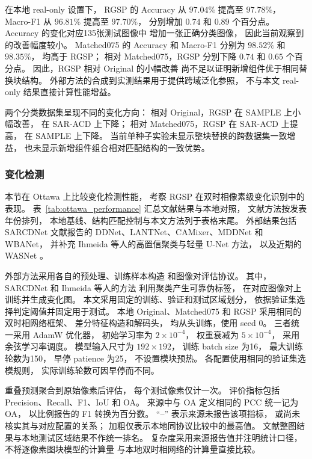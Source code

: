 在本地 real-only 设置下，
RGSP 的 Accuracy 从 $97.04\%$ 提高至 $97.78\%$，
Macro-F1 从 $96.81\%$ 提高至 $97.70\%$，
分别增加 $0.74$ 和 $0.89$ 个百分点。
Accuracy 的变化对应135张测试图像中
增加一张正确分类图像，
因此当前观察到的改善幅度较小。
Matched075 的 Accuracy 和 Macro-F1
分别为 $98.52\%$ 和 $98.35\%$，
均高于 RGSP；
相对 Matched075，RGSP 分别下降
$0.74$ 和 $0.65$ 个百分点。
因此，RGSP 相对 Original 的小幅改善
尚不足以证明新增组件优于相同替换块结构。
外部方法的合成到实测结果用于提供跨域泛化参照，
不与本文 real-only 结果直接计算性能增益。

两个分类数据集呈现不同的变化方向：
相对 Original，RGSP 在 SAMPLE 上小幅改善，
在 SAR-ACD 上下降；
相对 Matched075，RGSP 在 SAR-ACD 上提高，
在 SAMPLE 上下降。
当前单种子实验未显示整块替换的跨数据集一致增益，
也未显示新增组件组合相对匹配结构的一致优势。
\subsubsection{变化检测}
\label{sec:change_detection_results}

本节在 Ottawa 上比较变化检测性能，
考察 RGSP 在双时相像素级变化识别中的表现。
表~\ref{tab:ottawa_performance}
汇总文献结果与本地对照，
文献方法按发表年份排列，
本地基线、结构匹配控制与本文方法列于表格末尾。
外部结果包括 SARCDNet 文献报告的
DDNet、LANTNet、CAMixer、MDDNet 和 WBANet，
并补充 Ihmeida 等人的高置信聚类与轻量 U-Net 方法，
以及近期的 WASNet
\cite{sarcdnet2026,ihmeida2025,wasnet2026}。

外部方法采用各自的预处理、训练样本构造
和图像对评估协议。
其中，SARCDNet 和 Ihmeida 等人的方法
利用聚类产生可靠伪标签，
在对应图像对上训练并生成变化图。
本文采用固定的训练、验证和测试区域划分，
依据验证集选择判定阈值并固定用于测试。
本地 Original、Matched075 和 RGSP
采用相同的双时相网络框架、
差分特征构造和解码头，
均从头训练，使用 seed 0。
三者统一采用 AdamW 优化器，
初始学习率为 $2\times10^{-4}$，
权重衰减为 $5\times10^{-4}$，
采用余弦学习率调度。
模型输入尺寸为 $192\times192$，
训练 batch size 为16，
最大训练轮数为150，
早停 patience 为25，
不设置模块预热。
各配置使用相同的验证集选模规则，
实际训练轮数可因早停而不同。

重叠预测聚合到原始像素后评估，
每个测试像素仅计一次。
评价指标包括 Precision、Recall、F1、IoU 和 OA。
来源中与 OA 定义相同的 PCC 统一记为 OA，
以比例报告的 F1 转换为百分数。
``--'' 表示来源未报告该项指标，
或尚未核实其与对应配置的关系；
加粗仅表示本地同协议比较中的最高值。
文献整图结果与本地测试区域结果不作统一排名。
复杂度采用来源报告值并注明统计口径，
不将逐像素图块模型的计算量
与本地双时相网络的计算量直接比较。

